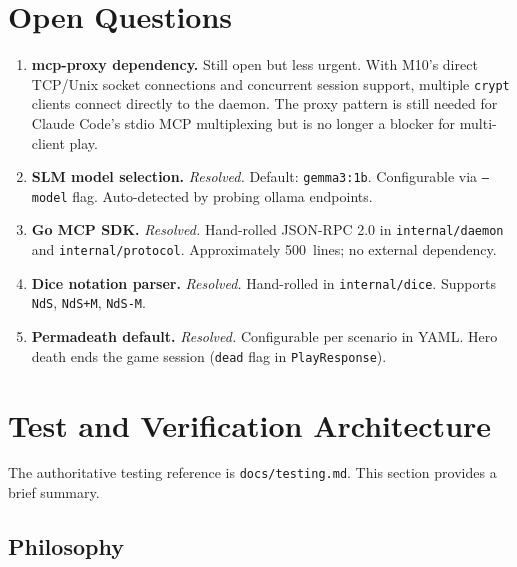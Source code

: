 \documentclass[a4paper,10pt]{article}
\newcommand{\cmd}[1]{\texttt{#1}}
\newcommand{\field}[1]{\texttt{#1}}
\newcommand{\pkg}[1]{\texttt{#1}}
\begin{document}
\section{Open Questions}

\begin{enumerate}[label=\textbf{Q\arabic*}.]
  \item \textbf{mcp-proxy dependency.}
    Still open but less urgent.  With M10's direct TCP/Unix socket
    connections and concurrent session support, multiple \cmd{crypt}
    clients connect directly to the daemon.  The proxy pattern is
    still needed for Claude Code's stdio MCP multiplexing but is no
    longer a blocker for multi-client play.
  \item \textbf{SLM model selection.}
    \emph{Resolved.}  Default: \texttt{gemma3:1b}.  Configurable via
    \cmd{--model} flag.  Auto-detected by probing ollama endpoints.
  \item \textbf{Go MCP SDK.}
    \emph{Resolved.}  Hand-rolled JSON-RPC 2.0 in
    \pkg{internal/\allowbreak daemon} and
    \pkg{internal/\allowbreak protocol}.  Approximately 500~lines;
    no external dependency.
  \item \textbf{Dice notation parser.}
    \emph{Resolved.}  Hand-rolled in \pkg{internal/dice}.  Supports
    \texttt{NdS}, \texttt{NdS+M}, \texttt{NdS-M}.
  \item \textbf{Permadeath default.}
    \emph{Resolved.}  Configurable per scenario in YAML.  Hero death
    ends the game session (\field{dead} flag in \texttt{PlayResponse}).
\end{enumerate}

\section{Test and Verification Architecture}
\label{sec:testing}

The authoritative testing reference is \texttt{docs/testing.md}.
This section provides a brief summary.

\subsection{Philosophy}
\end{document}
